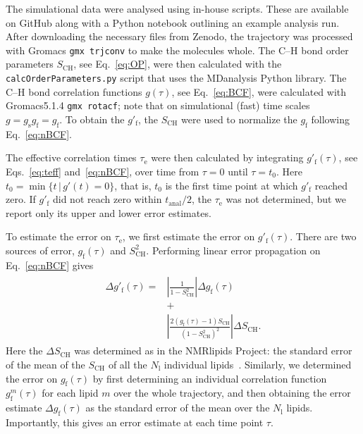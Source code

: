 \documentclass[journal=jpcbfk,manuscript=article,layout=twocolumn]{achemso}
\begin{document}
The simulational data were analysed using in-house scripts. These are available on GitHub \cite{citehere} along with a Python notebook outlining an example analysis run.
After downloading the necessary files from Zenodo, the trajectory was processed with Gromacs \texttt{gmx trjconv} to make the molecules whole.
The C--H bond order parameters  $S_\mathrm{CH}$, see Eq.~\eqref{eq:OP}, were then calculated with the \texttt{calcOrderParameters.py}\cite{citegithubhere} script that uses the MDanalysis\cite{XXX} Python library.
%
The \mbox{C--H} bond correlation functions
$g(\tau)$, see Eq.~\eqref{eq:BCF},
were calculated with Gromacs5.1.4\cite{XXX} \texttt{gmx rotacf};
note that on simulational (fast) time scales $g = g_\mathrm{s} g_\mathrm{f}= g_\mathrm{f}$.
%
To obtain the $g'_\mathrm f$,
the $S_\mathrm{CH}$ were used to
normalize the $g_\mathrm f$ following Eq.~\eqref{eq:nBCF}.

The effective correlation times $\tau_\mathrm e$ were then calculated by integrating $g'_\mathrm f(\tau)$,
see Eqs.~\eqref{eq:teff} and~\eqref{eq:nBCF},
over time from $\tau=0$ until $\tau = t_0$.
Here
$t_0 = \min
	\{
	t\,|\,g'(t)=0
	\}
$,
that is, $t_\mathrm 0$ is the first time point at which $g'_\mathrm f$ reached zero.
%
If $g'_\mathrm f$ did not reach zero within 
$t_\mathrm{anal}/2$, the 
$\tau_\mathrm e$ was not determined,
but we report only its upper and lower error estimates.

To estimate the error on $\tau_\mathrm e$, we first estimate the error on $g'_\mathrm f(\tau)$.
%
There are two sources of error, $g_{\mathrm{f}}(\tau)$ and $S^2_\mathrm{CH}$.
%
Performing linear error propagation on Eq.~\eqref{eq:nBCF} gives
\begin{align}
\begin{split}
\label{eq:error}
\Delta g'_{\mathrm{f}}(\tau)
=
&\left|
	\frac{1}{1-S^2_\mathrm{CH}}
\right|
\Delta g_{\mathrm{f}}(\tau)\\
&+\\
&\left|
	\frac{2\left(g_\mathrm{f}(\tau)-1\right)S_\mathrm{CH}}{\left(1-S^2_\mathrm{CH}\right)^2}
\right|
\Delta S_\mathrm{CH}.
\end{split}
\end{align}
Here the $\Delta S_\mathrm{CH}$ was determined as in the NMR\-lipids Project:
the standard error of the mean of the $S_\mathrm{CH}$ of all the $N_\mathrm l$ individual lipids~\cite{botan15}.
%
Similarly, we determined the error on $g_{\mathrm{f}}(\tau)$
by first determining an individual correlation function $g^m_{\mathrm{f}}(\tau)$ for each lipid $m$
over the whole trajectory, and then obtaining the error estimate
$\Delta g_{\mathrm{f}}(\tau)$
as the standard error of the mean over the $N_\mathrm l$ lipids.
%
Importantly, this gives an error estimate at each time point $\tau$.
\end{document}
